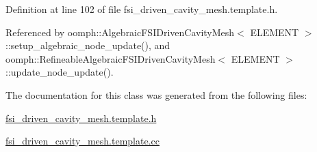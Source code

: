 Definition at line 102 of file fsi\+\_\+driven\+\_\+cavity\+\_\+mesh.\+template.\+h.



Referenced by oomph\+::\+Algebraic\+F\+S\+I\+Driven\+Cavity\+Mesh$<$ E\+L\+E\+M\+E\+N\+T $>$\+::setup\+\_\+algebraic\+\_\+node\+\_\+update(), and oomph\+::\+Refineable\+Algebraic\+F\+S\+I\+Driven\+Cavity\+Mesh$<$ E\+L\+E\+M\+E\+N\+T $>$\+::update\+\_\+node\+\_\+update().



The documentation for this class was generated from the following files\+:\begin{DoxyCompactItemize}
\item 
\hyperlink{fsi__driven__cavity__mesh_8template_8h}{fsi\+\_\+driven\+\_\+cavity\+\_\+mesh.\+template.\+h}\item 
\hyperlink{fsi__driven__cavity__mesh_8template_8cc}{fsi\+\_\+driven\+\_\+cavity\+\_\+mesh.\+template.\+cc}\end{DoxyCompactItemize}

